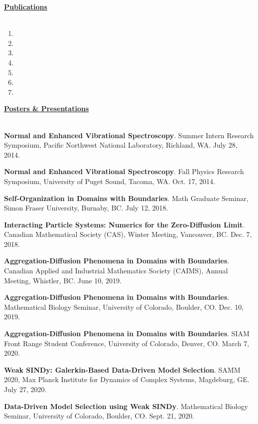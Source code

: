 \documentclass[letterpaper,11pt,oneside]{article}
\newcommand{\headr}[1]{\vspace{10pt}\uline{\Large{\textbf{#1}} \hfill } \\ \vspace{-10pt}\\}
\begin{document}
\headr{Publications}

\begin{enumerate}
\item {}
\item {}
\item {}
\item {}
\item {}
\item {}
\item {}
\end{enumerate}

\headr{Posters \& Presentations}

\begin{enumerate}[label={[\arabic*]}]
\item \textbf{Normal and Enhanced Vibrational Spectroscopy}. Summer Intern Research Symposium, Pacific Northwest National Laboratory, Richland, WA. July 28, 2014.
\item \textbf{Normal and Enhanced Vibrational Spectroscopy}. Fall Physics Research Symposium, University of Puget Sound, Tacoma, WA. Oct. 17, 2014.
\item \textbf{Self-Organization in Domains with Boundaries}. Math Graduate Seminar, Simon Fraser University, Burnaby, BC. July 12, 2018.
\item \textbf{Interacting Particle Systems: Numerics for the Zero-Diffusion Limit}. Canadian Mathematical Society (CAS), Winter Meeting, Vancouver, BC. Dec. 7, 2018.
\item \textbf{Aggregation-Diffusion Phenomena in Domains with Boundaries}. Canadian Applied and Industrial Mathematics Society (CAIMS), Annual Meeting, Whistler, BC. June 10, 2019.
\item \textbf{Aggregation-Diffusion Phenomena in Domains with Boundaries}. Mathematical Biology Seminar, University of Colorado, Boulder, CO. Dec. 10, 2019.
\item \textbf{Aggregation-Diffusion Phenomena in Domains with Boundaries}. SIAM Front Range Student Conference, University of Colorado, Denver, CO. March 7, 2020.
\item \textbf{Weak SINDy: Galerkin-Based Data-Driven Model Selection}. SAMM 2020, Max Planck Institute for Dynamics of Complex Systems, Magdeburg, GE. July 27, 2020.
\item \textbf{Data-Driven Model Selection using Weak SINDy}. Mathematical Biology Seminar, University of Colorado, Boulder, CO. Sept. 21, 2020.

\end{enumerate}
\end{document}
